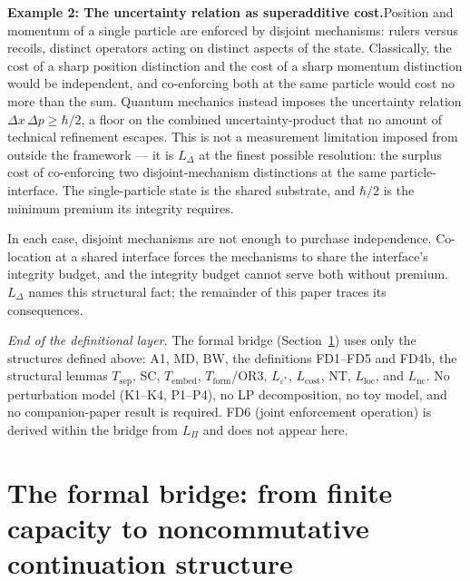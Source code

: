 \documentclass[11pt]{article}
\theoremstyle{remark}
\begin{document}
\begin{tcolorbox}[apfbox, title={The gap between $L_{\mathrm{nc}}$ and $L_\Delta$: where classical models end}]
\smallskip\noindent\textbf{Example 2: The uncertainty relation as superadditive cost.}\quad Position and momentum of a single particle are enforced by disjoint mechanisms: rulers versus recoils, distinct operators acting on distinct aspects of the state.  Classically, the cost of a sharp position distinction and the cost of a sharp momentum distinction would be independent, and co-enforcing both at the same particle would cost no more than the sum.  Quantum mechanics instead imposes the uncertainty relation $\Delta x \, \Delta p \ge \hbar/2$, a floor on the combined uncertainty-product that no amount of technical refinement escapes.  This is not a measurement limitation imposed from outside the framework --- it is $L_\Delta$ at the finest possible resolution: the surplus cost of co-enforcing two disjoint-mechanism distinctions at the same particle-interface.  The single-particle state is the shared substrate, and $\hbar/2$ is the minimum premium its integrity requires.

\smallskip\noindent In each case, disjoint mechanisms are not enough to purchase independence.  Co-location at a shared interface forces the mechanisms to share the interface's integrity budget, and the integrity budget cannot serve both without premium.  $L_\Delta$ names this structural fact; the remainder of this paper traces its consequences.
\end{tcolorbox}


\medskip\noindent\textit{End of the definitional layer.}  The formal bridge
(Section~\ref{sec:formal_bridge}) uses only the structures defined above:
A1, MD, BW, the definitions FD1--FD5 and FD4b, the structural lemmas
$T_{\mathrm{sep}}$, SC, $T_{\mathrm{embed}}$, $T_{\mathrm{form}}$/OR3,
$L_{\varepsilon^*}$, $L_{\mathrm{cost}}$, NT, $L_{\mathrm{loc}}$, and
$L_{\mathrm{nc}}$.  No perturbation model (K1--K4, P1--P4), no LP
decomposition, no toy model, and no companion-paper result is required.
FD6 (joint enforcement operation) is derived within the bridge from
$L_\Pi$ and does not appear here.


\section{The formal bridge: from finite capacity to noncommutative continuation structure}
\label{sec:formal_bridge}\label{sec:bridge}
\end{document}
